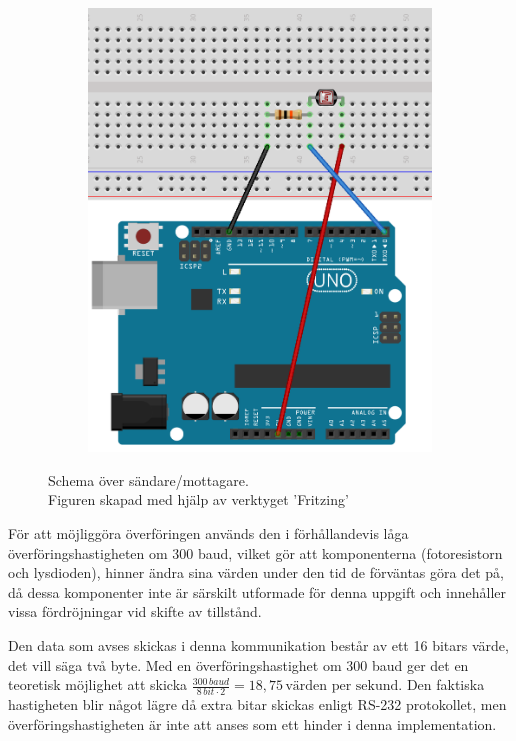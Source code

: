 \begin{figure}
\begin{subfigure}[b]{0.35\textwidth}
                    \includegraphics[width=\textwidth]{res/img/resistor}    
                \end{subfigure}
            \caption[Schema över sändare/mottagare]{Schema över sändare/mottagare. \\\tiny{Figuren skapad med hjälp av verktyget 'Fritzing'}}\label{fig:schema}
            \end{figure}

            För att möjliggöra överföringen används den i förhållandevis låga överföringshastigheten om 300 baud, vilket gör att komponenterna (fotoresistorn och lysdioden), hinner ändra sina värden under den tid de förväntas göra det på, då dessa komponenter inte är särskilt utformade för denna uppgift och innehåller vissa fördröjningar vid skifte av tillstånd. \bigskip

            Den data som avses skickas i denna kommunikation består av ett 16 bitars värde, det vill säga två byte. Med en överföringshastighet om 300 baud ger det en teoretisk möjlighet att skicka $\frac{300 \,\textit{baud}}{8 \, bit \cdot 2} = 18,75 \, \text{värden per sekund}$. Den faktiska hastigheten blir något lägre då extra bitar skickas enligt RS-232 protokollet, men överföringshastigheten är inte att anses som ett hinder i denna implementation. \bigskip
            



